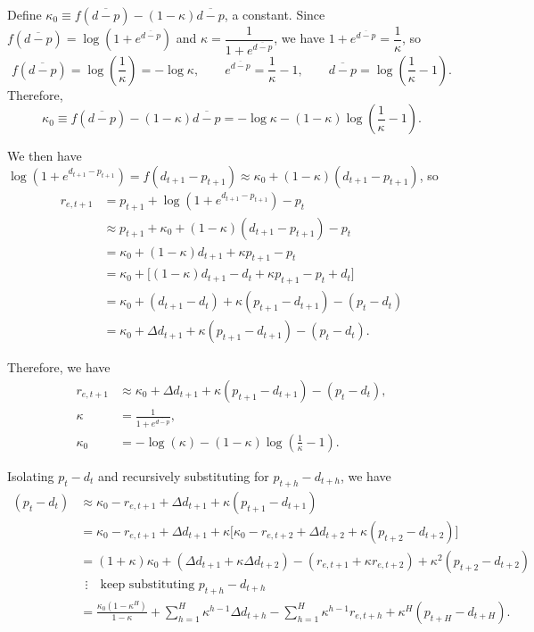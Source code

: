 \documentclass[11pt]{article}
\begin{document}
Define $\kappa_0 \equiv f(\overline{d-p}) - (1-\kappa)\overline{d-p}$, a constant. Since
$f(\overline{d-p}) = \log(1+e^{\overline{d-p}})$ and $\kappa = \dfrac{1}{1+e^{\overline{d-p}}}$,
we have $1+e^{\overline{d-p}} = \dfrac{1}{\kappa}$, so
\[
f(\overline{d-p}) = \log\!\left(\frac{1}{\kappa}\right) = -\log\kappa,
\qquad
e^{\overline{d-p}} = \frac{1}{\kappa}-1,
\qquad
\overline{d-p} = \log\!\left(\frac{1}{\kappa}-1\right).
\]
Therefore,
\[
\kappa_0 \equiv f(\overline{d-p}) - (1-\kappa)\overline{d-p} = -\log\kappa - (1-\kappa)\log\!\left(\frac{1}{\kappa}-1\right).
\]

We then have $\log(1+e^{d_{t+1}-p_{t+1}}) = f(d_{t+1}-p_{t+1}) \approx \kappa_0 + (1-\kappa)(d_{t+1}-p_{t+1})$, so
\begin{align*}
r_{e,t+1} &= p_{t+1} + \log\!\left(1+e^{d_{t+1}-p_{t+1}}\right) - p_t \\
&\approx p_{t+1} + \kappa_0 + (1-\kappa)(d_{t+1}-p_{t+1}) - p_t \\
&= \kappa_0 + (1-\kappa)d_{t+1} + \kappa p_{t+1} - p_t \\
&= \kappa_0 + \Big[(1-\kappa)d_{t+1} - d_t + \kappa p_{t+1} - p_t + d_t\Big] \\
&= \kappa_0 + (d_{t+1}-d_t) + \kappa(p_{t+1}-d_{t+1}) - (p_t-d_t) \\
&= \kappa_0 + \Delta d_{t+1} + \kappa(p_{t+1}-d_{t+1}) - (p_t-d_t).
\end{align*}

Therefore, we have
\begin{align*}
r_{e,t+1} &\approx \kappa_0 + \Delta d_{t+1}
    + \kappa(p_{t+1}-d_{t+1}) - (p_t-d_t), \\
\kappa &= \frac{1}{1+e^{\overline{d-p}}}, \\
\kappa_0 &= -\log(\kappa)
    - (1-\kappa)\log\!\left(\frac{1}{\kappa}-1\right).
\end{align*}

Isolating $p_t-d_t$ and recursively substituting for $p_{t+h}-d_{t+h}$, we have
\begin{align*}
(p_t - d_t) &\approx \kappa_0 - r_{e,t+1} + \Delta d_{t+1} + \kappa(p_{t+1}-d_{t+1}) \\
&= \kappa_0 - r_{e,t+1} + \Delta d_{t+1} + \kappa\Big[\kappa_0 - r_{e,t+2} + \Delta d_{t+2} + \kappa(p_{t+2}-d_{t+2})\Big] \\
&= (1+\kappa)\kappa_0 + (\Delta d_{t+1}+\kappa \Delta d_{t+2}) - (r_{e,t+1}+\kappa r_{e,t+2}) + \kappa^{2}(p_{t+2}-d_{t+2}) \\
&\ \ \vdots \quad \text{keep substituting } p_{t+h}-d_{t+h} \\
&= \frac{\kappa_0(1-\kappa^{H})}{1-\kappa} + \sum_{h=1}^{H}\kappa^{h-1}\Delta d_{t+h} - \sum_{h=1}^{H}\kappa^{h-1}r_{e,t+h} + \kappa^{H}(p_{t+H}-d_{t+H}).
\end{align*}
\end{document}
